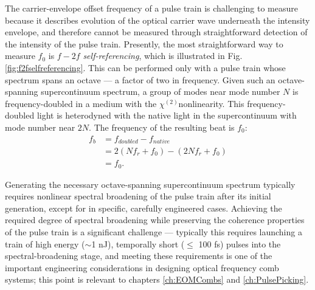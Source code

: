 The carrier-envelope offset frequency of a pulse train is challenging to measure because it describes evolution of the optical carrier wave underneath the intensity envelope, and therefore cannot be measured through straightforward detection of the intensity of the pulse train. Presently, the most straightforward way to measure $f_0$ is $f-2f$ \textit{self-referencing}, which is illustrated in Fig.\ref{fig:f2fselfreferencing}. This can be performed only with a pulse train whose spectrum spans an octave --- a factor of two in frequency. Given such an octave-spanning supercontinuum spectrum, a group of modes near mode number $N$ is frequency-doubled in a medium with the $\chi^(2)$nonlinearity. This frequency-doubled light is heterodyned with the native light in the supercontinuum with mode number near $2N$. The frequency of the resulting beat is $f_0$:
\begin{align}
f_b&=f_{doubled}-f_{native}\\
&=2(Nf_r+f_0)-(2Nf_r+f_0)\\
&=f_0.
\end{align}

Generating the necessary octave-spanning supercontinuum spectrum typically requires nonlinear spectral broadening of the pulse train after its initial generation, except for in specific, carefully engineered cases. Achieving the required degree of spectral broadening while preserving the coherence properties of the pulse train is a significant challenge --- typically this requires launching a train of high energy ($\sim$1 nJ), temporally short ($\leq$ 100 fs) pulses into the spectral-broadening stage, and meeting these requirements is one of the important engineering considerations in designing optical frequency comb systems; this point is relevant to chapters \ref{ch:EOMCombs} and \ref{ch:PulsePicking}. 

